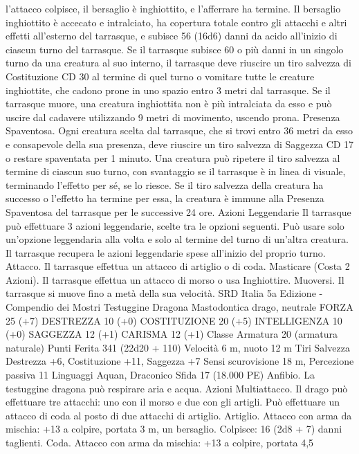 \begin{multicols}{2}
l’attacco colpisce, il bersaglio è inghiottito, e l’afferrare ha
termine. Il bersaglio inghiottito è accecato e intralciato, ha
copertura totale contro gli attacchi e altri effetti all’esterno del
tarrasque, e subisce 56 (16d6) danni da acido all’inizio di ciascun
turno del tarrasque.
Se il tarrasque subisce 60 o più danni in un singolo turno da una
creatura al suo interno, il tarrasque deve riuscire un tiro salvezza
di Costituzione CD 30 al termine di quel turno o vomitare tutte le
creature inghiottite, che cadono prone in uno spazio entro 3 metri
dal tarrasque. Se il tarrasque muore, una creatura inghiottita non
è più intralciata da esso e può uscire dal cadavere utilizzando 9
metri di movimento, uscendo prona.
Presenza Spaventosa. Ogni creatura scelta dal tarrasque, che si
trovi entro 36 metri da esso e consapevole della sua presenza,
deve riuscire un tiro salvezza di Saggezza CD 17 o restare
spaventata per 1 minuto. Una creatura può ripetere il tiro
salvezza al termine di ciascun suo turno, con svantaggio se il
tarrasque è in linea di visuale, terminando l’effetto per sé, se lo
riesce. Se il tiro salvezza della creatura ha successo o l’effetto ha
termine per essa, la creatura è immune alla Presenza Spaventosa
del tarrasque per le successive 24 ore.
Azioni Leggendarie
Il tarrasque può effettuare 3 azioni leggendarie, scelte tra le
opzioni seguenti. Può usare solo un’opzione leggendaria alla
volta e solo al termine del turno di un’altra creatura. Il tarrasque
recupera le azioni leggendarie spese all’inizio del proprio turno.
Attacco. Il tarrasque effettua un attacco di artiglio o di coda.
Masticare (Costa 2 Azioni). Il tarrasque effettua un attacco di
morso o usa Inghiottire.
Muoversi. Il tarrasque si muove fino a metà della sua velocità.
SRD Italia 5a Edizione - Compendio dei Mostri
Testuggine Dragona
Mastodontica drago, neutrale
FORZA 25 (+7)
DESTREZZA 10 (+0)
COSTITUZIONE 20 (+5)
INTELLIGENZA 10 (+0)
SAGGEZZA 12 (+1)
CARISMA 12 (+1)
Classe Armatura 20 (armatura naturale)
Punti Ferita 341 (22d20 + 110)
Velocità 6 m, nuoto 12 m
Tiri Salvezza Destrezza +6, Costituzione +11, Saggezza +7
Sensi scurovisione 18 m, Percezione passiva 11
Linguaggi Aquan, Draconico
Sfida 17 (18.000 PE)
Anfibio. La testuggine dragona può respirare aria e acqua.
Azioni
Multiattacco. Il drago può effettuare tre attacchi: uno con il
morso e due con gli artigli. Può effettuare un attacco di coda al
posto di due attacchi di artiglio.
Artiglio. Attacco con arma da mischia: +13 a colpire, portata 3
m, un bersaglio.
Colpisce: 16 (2d8 + 7) danni taglienti.
Coda. Attacco con arma da mischia: +13 a colpire, portata 4,5

\end{multicols}
